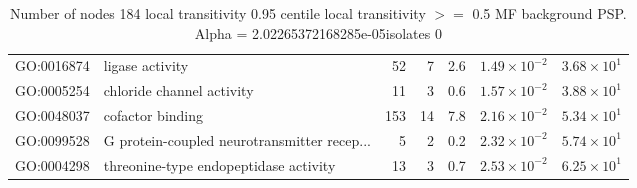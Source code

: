 \begin{table}[ht]
\begin{adjustbox}{max width=\textwidth}
\begin{tabular}{llrrrrr}
  GO:0016874 & ligase activity & 52 & 7 & 2.6 & $1.49 \times 10^{-2}$ & $3.68 \times 10^{1}$ \\ 
  GO:0005254 & chloride channel activity & 11 & 3 & 0.6 & $1.57 \times 10^{-2}$ & $3.88 \times 10^{1}$ \\ 
  GO:0048037 & cofactor binding & 153 & 14 & 7.8 & $2.16 \times 10^{-2}$ & $5.34 \times 10^{1}$ \\ 
  GO:0099528 & G protein-coupled neurotransmitter recep... & 5 & 2 & 0.2 & $2.32 \times 10^{-2}$ & $5.74 \times 10^{1}$ \\ 
  GO:0004298 & threonine-type endopeptidase activity & 13 & 3 & 0.7 & $2.53 \times 10^{-2}$ & $6.25 \times 10^{1}$ \\ 
   \hline
\end{tabular}
\end{adjustbox}
\caption{Number of nodes 184 local transitivity 0.95 centile  local transitivity $>=$ 0.5 MF background PSP. Alpha = 2.02265372168285e-05isolates 0} 
\label{tab:Number of nodes 184 local transitivity 0.95 centile  local transitivity $>=$ 0.5 MF background PSP. Alpha = 2.02265372168285e-05isolates 0}
\end{table}


